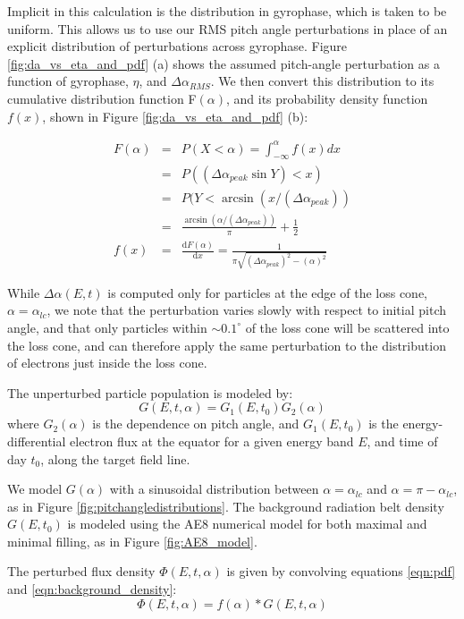 Implicit in this calculation is the distribution in gyrophase, which is taken to be uniform. This allows us to use our RMS pitch angle perturbations in place of an explicit distribution of perturbations across gyrophase. Figure \ref{fig:da_vs_eta_and_pdf} (a) shows the assumed pitch-angle perturbation as a function of gyrophase, $\eta$, and $\Delta \alpha_{RMS}$. We then convert this distribution to its cumulative distribution function F$(\alpha)$, and its probability density function $f(x)$, shown in Figure \ref{fig:da_vs_eta_and_pdf} (b):

\begin{eqnarray}
F(\alpha) & = & P(X < \alpha) = \int_{-\infty}^\alpha f(x) dx \nonumber \\
& = & P((\Delta \alpha_{peak}\sin Y) < x) \nonumber \\
& = & P(Y < \arcsin(x/(\Delta\alpha_{peak})) \nonumber \\  
& = & \frac{\arcsin(\alpha/(\Delta\alpha_{peak}))}{\pi} + \frac{1}{2}  \\
 f(x) & = & \frac{\mathrm{d}F(\alpha)}{\mathrm{d}x} = \frac{1}{\pi\sqrt{(\Delta \alpha_{peak})^2 - (\alpha)^2}}
 \label{eqn:pdf}
\end{eqnarray}

While $\Delta \alpha(E,t)$ is computed only for particles at the edge of the loss cone, $\alpha = \alpha_{lc}$, we note that the perturbation varies slowly with respect to initial pitch angle, and that only particles within $\sim 0.1^\circ$ of the loss cone will be scattered into the loss cone, and can therefore apply the same perturbation to the distribution of electrons just inside the loss cone.

The unperturbed particle population is modeled by:
\begin{equation}
G(E,t,\alpha) = G_1(E, t_0)G_2(\alpha)
\label{eqn:background_density}
\end{equation}
where $G_2(\alpha)$ is the dependence on pitch angle, and $G_1(E, t_0)$ is the energy-differential electron flux at the equator for a given energy band $E$, and time of day $t_0$, along the target field line.

We model $G(\alpha)$ with a sinusoidal distribution between $\alpha=\alpha_{lc}$ and $\alpha = \pi - \alpha_{lc}$, as in Figure \ref{fig:pitchangledistributions}. The background radiation belt density $G(E,t_0)$ is modeled using the AE8 numerical model for both maximal and minimal filling, as in Figure \ref{fig:AE8_model}.

The perturbed flux density $\Phi(E,t,\alpha)$ is given by convolving equations \eqref{eqn:pdf} and \eqref{eqn:background_density}:
\begin{equation}
\Phi(E,t,\alpha) = f(\alpha)*G(E,t,\alpha)
\label{eqn:convolution}
\end{equation}


